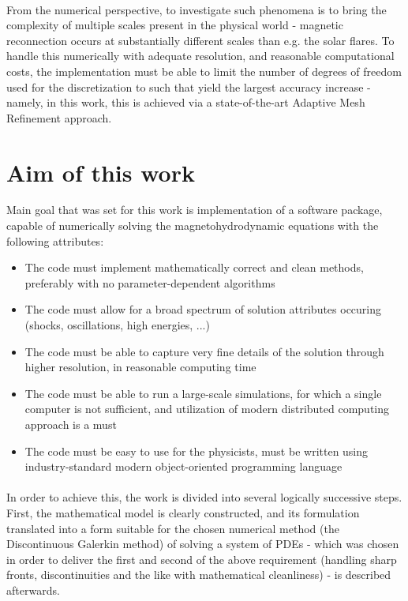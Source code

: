 \paragraph{}
From the numerical perspective, to investigate such phenomena is to bring the complexity of multiple scales present in the physical world - magnetic reconnection occurs at substantially different scales than e.g. the solar flares. To handle this numerically with adequate resolution, and reasonable computational costs, the implementation must be able to limit the number of degrees of freedom used for the discretization to such that yield the largest accuracy increase - namely, in this work, this is achieved via a state-of-the-art Adaptive Mesh Refinement approach.

\section{Aim of this work}
Main goal that was set for this work is implementation of a software package, capable of numerically solving the magnetohydrodynamic equations with the following attributes:
\begin{itemize}
	\item The code must implement mathematically correct and clean methods, preferably with no parameter-dependent algorithms
	\item The code must allow for a broad spectrum of solution attributes occuring (shocks, oscillations, high energies, ...)
	\item The code must be able to capture very fine details of the solution through higher resolution, in reasonable computing time
	\item The code must be able to run a large-scale simulations, for which a single computer is not sufficient, and utilization of modern distributed computing approach is a must
	\item The code must be easy to use for the physicists, must be written using industry-standard modern object-oriented programming language
\end{itemize}
\paragraph{}
In order to achieve this, the work is divided into several logically successive steps. First, the mathematical model is clearly constructed, and its formulation translated into a form suitable for the chosen numerical method (the Discontinuous Galerkin method) of solving a system of PDEs - which was chosen in order to deliver the first and second of the above requirement (handling sharp fronts, discontinuities and the like with mathematical cleanliness) - is described afterwards.
